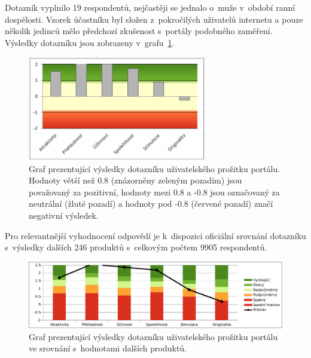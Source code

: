 Dotazník vyplnilo 19 respondentů, nejčastěji se jednalo o~muže v~období ranní dospělosti. Vzorek účastníku byl složen z~pokročilých uživatelů internetu a pouze několik jedinců mělo předchozí zkušenost s~portály podobného zaměření. Výsledky dotazníku jsou zobrazeny v~grafu~\ref{img:ueq-result}.

\begin{figure}[H]
	\centering
	\includegraphics[width=0.7\textwidth]{obrazky-figures/ueq-result.pdf}
	\caption{Graf prezentující výsledky dotazníku uživatelského prožitku portálu. Hodnoty větší než 0.8 (znázorněny zeleným pozadím) jsou považovaný za pozitivní, hodnoty mezi 0.8 a -0.8 jsou označovaný za neutrální (žluté pozadí) a hodnoty pod -0.8 (červené pozadí) značí negativní výsledek.}
    \label{img:ueq-result}
\end{figure}

Pro relevantnější vyhodnocení odpovědí je k~dispozici oficiální srovnání dotazníku s~výsledky dalších 246 produktů s~celkovým počtem 9905 respondentů. 

\begin{figure}[H]
	\centering
	\includegraphics[width=\textwidth]{obrazky-figures/ueq.pdf}
	\caption{Graf prezentující výsledky dotazníku uživatelského prožitku portálu ve srovnání s~hodnotami dalších produktů.}
    \label{img:ueq}
\end{figure}

